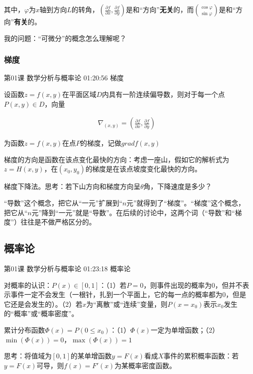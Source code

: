 \documentclass[UTF8]{ctexart}
\begin{document}
其中，$\varphi$为$x$轴到方向$L$的转角，$\left ( \frac{\partial f}{\partial x},\frac{\partial f}{\partial y}  \right )$是和“方向”\textbf{无关}的，而$\binom{\cos \varphi}{\sin \varphi}$是和“方向”\textbf{有关}的。


我的问题：“可微分”的概念怎么理解呢？

\subsubsection{梯度}

第01课 数学分析与概率论 01:20:56 梯度

设函数$z=f(x,y)$在平面区域$D$内具有一阶连续偏导数，则对于每一个点$P(x,y) \in D$，向量

\begin{equation}
\begin{aligned}
\nabla_{(x,y)} = \left ( \frac{\partial f}{\partial x},\frac{\partial f}{\partial y}  \right )
\end{aligned}
\end{equation}

为函数$z=f(x,y)$在点$P$的梯度，记做$gradf(x,y)$

梯度的方向是函数在该点变化最快的方向：考虑一座山，假如它的解析式为$z=H(x,y)$，在$(x_{0},y_{0})$的梯度是在该点坡度变化最快的方向。

梯度下降法。思考：若下山方向和梯度方向呈$\theta$角，下降速度是多少？

“导数”这个概念，把它从“一元”扩展到“$n$元”就得到了“梯度”。“梯度”这个概念，把它从“$n$元”降到“一元”就是“导数”。在后续的讨论中，这两个词（“导数”和“梯度”）往往是不做严格区分的。

\subsection{概率论}

第01课 数学分析与概率论 01:23:18 概率论

对概率的认识：$P(x) \in [0,1]$：（1）若$P=0$，则事件出现的概率为0，但并不表示事件一定不会发生（一根针，扎到一个平面上，它的每一点的概率都为0，但是它还是会发生的）。（2）若$x$为“离散”或“连续”变量，则$P(x=x_{0})$表示$x_{0}$发生的“概率”或“概率密度”。

累计分布函数$\Phi (x) = P(0 \leq x_{0})$：（1）$\Phi (x)$一定为单增函数；（2）$\min (\Phi (x))=0$，$\max (\Phi (x))=1$

思考：将值域为$[0,1]$的某单增函数$y=F(x)$看成$X$事件的累积概率函数：若$y=F(x)$可导，则$f(x)=F'(x)$为某概率密度函数。
\end{document}
